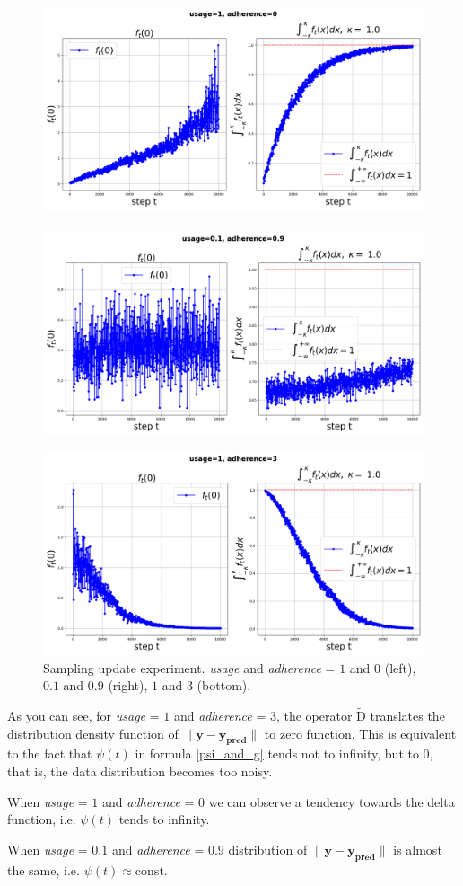 \documentclass{article}
\begin{document}
        \begin{figure}[h!]
            \centering
            \includegraphics[width=0.49\linewidth]{pictures/ft0_sample_1_0.png}~~
            ~~\includegraphics[width=0.49\linewidth]{pictures/ft0_sample_0.1_0.9.png}
            
            \includegraphics[width=0.49\linewidth]{pictures/ft0_sample_1_3.png}
            
            \caption{Sampling update experiment. \textit{usage} and \textit{adherence} = $1$ and $0$ (left), $0.1$ and $0.9$ (right), $1$ and $3$ (bottom).}
            \label{delta_sample}
        \end{figure}

        As you can see, for \textit{usage} = $1$ and \textit{adherence} = $3$, the operator $\widetilde{\text{D}}$ translates the distribution density function of $\|\mathbf{y} - \mathbf{y_{\text{pred}}}\|$ to zero function. This is equivalent to the fact that $\psi(t)$ in formula \ref{psi_and_g} tends not to infinity, but to $0$, that is, the data distribution becomes too noisy.
        
        When \textit{usage} = $1$ and \textit{adherence} = $0$ we can observe a tendency towards the delta function, i.e. $\psi(t)$ tends to infinity. 

        When \textit{usage} = $0.1$ and \textit{adherence} = $0.9$ distribution of $\|\mathbf{y} - \mathbf{y_{\text{pred}}}\|$ is almost the same, i.e. $\psi(t) \approx \text{const}.$
\end{document}
